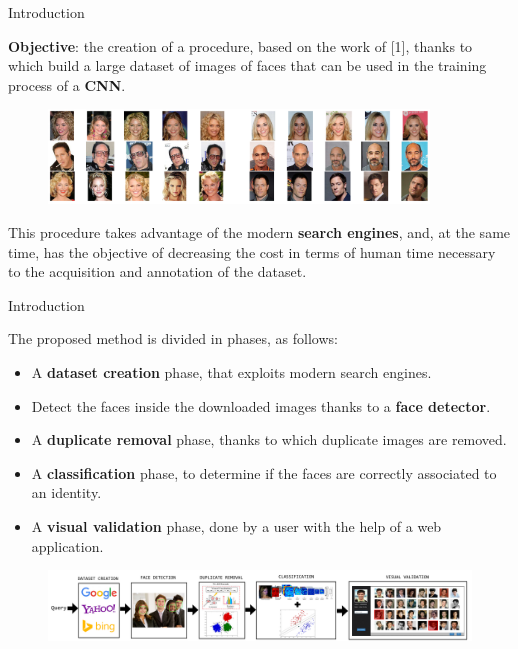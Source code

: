 \begin{tframe}{Introduction}

\textbf{Objective}: the creation of a procedure, based on the work of [1], thanks to which build a large dataset of images of faces that can be used in the training process of a \textbf{CNN}.

\begin{figure}[h]
\begin{center}
\includegraphics[width=0.9\textwidth]{images/image12.png}
\end{center}
\end{figure}

This procedure takes advantage of the modern \textbf{search engines}, and, at the same time, has the objective of decreasing the cost in terms of human time necessary to the acquisition and annotation of the dataset.

\end{tframe}

\begin{tframe}{Introduction}

The proposed method is divided in phases, as follows:

\begin{itemize}
\item A \textbf{dataset creation} phase, that exploits modern search engines.
\item Detect the faces inside the downloaded images thanks to a \textbf{face detector}.
\item A \textbf{duplicate removal} phase, thanks to which duplicate images are removed.
\item A \textbf{classification} phase, to determine if the faces are correctly associated to an identity.
\item A \textbf{visual validation} phase, done by a user with the help of a web application.
\end{itemize}

\begin{figure}[plain]
    \hspace*{-9mm}
    \includegraphics[width=\paperwidth]{images/pipeline2.png}
\end{figure} 


\end{tframe}